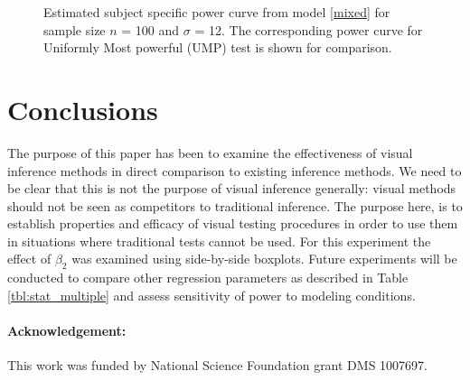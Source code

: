 \documentclass{article}
\begin{document}
\begin{figure}[hbtp]
   \centering
       \caption{Estimated subject specific power curve from model \ref{mixed} for sample size $n$ = 100 and $\sigma$ = 12.  The corresponding power curve for Uniformly Most powerful (UMP) test is shown for comparison.}
       \label{fig:power_subject}
\end{figure}


\section{Conclusions}

The purpose of this paper has been to examine the effectiveness of visual inference methods in direct comparison to existing inference methods. We need to be clear that this is not the purpose of visual inference generally: visual methods should not be seen as competitors to traditional inference.  The purpose here, is to  establish properties and  efficacy of visual testing procedures in order to use them in situations where traditional tests cannot be used. For this experiment the effect of $\beta_2$ was examined using side-by-side boxplots. Future experiments will be conducted to compare other regression parameters as described in Table \ref{tbl:stat_multiple} and assess sensitivity of power to modeling conditions.

\paragraph{Acknowledgement:}

This work was funded by National Science Foundation grant DMS 1007697.

%
%

%


\end{document}
